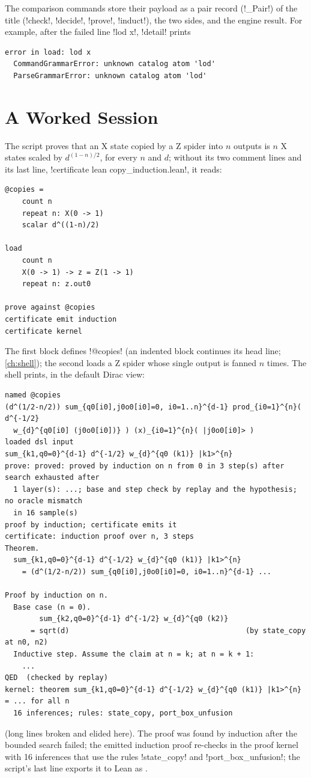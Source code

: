 The comparison commands store their payload as a pair record (\py!_Pair!) of the title (\code!check!, \code!decide!, \code!prove!, \code!induct!), the two sides, and the engine result. For example, after the failed line \code!lod x!, \azx!detail! prints
\begin{lstlisting}[style=grammar]
error in load: lod x
  CommandGrammarError: unknown catalog atom 'lod'
  ParseGrammarError: unknown catalog atom 'lod'
\end{lstlisting}

\section{A Worked Session}\label{sec:language-example}

The script  proves that an X state copied by a Z spider into $n$ outputs is $n$ X states scaled by $d^{(1-n)/2}$, for every $n$ and $d$; without its two comment lines and its last line, \azx!certificate lean copy_induction.lean!, it reads:
\begin{lstlisting}[style=azx]
@copies =
    count n
    repeat n: X(0 -> 1)
    scalar d^((1-n)/2)

load
    count n
    X(0 -> 1) -> z = Z(1 -> 1)
    repeat n: z.out0

prove against @copies
certificate emit induction
certificate kernel
\end{lstlisting}
The first block defines \code!@copies! (an indented block continues its head line; \cref{ch:shell}); the second loads a Z spider whose single output is fanned $n$ times. The shell prints, in the default Dirac view:
\begin{lstlisting}[style=grammar]
named @copies
(d^(1/2-n/2)) sum_{q0[i0],j0o0[i0]=0, i0=1..n}^{d-1} prod_{i0=1}^{n}( d^{-1/2}
  w_{d}^{q0[i0] (j0o0[i0])} ) (x)_{i0=1}^{n}( |j0o0[i0]> )
loaded dsl input
sum_{k1,q0=0}^{d-1} d^{-1/2} w_{d}^{q0 (k1)} |k1>^{n}
prove: proved: proved by induction on n from 0 in 3 step(s) after search exhausted after
  1 layer(s): ...; base and step check by replay and the hypothesis; no oracle mismatch
  in 16 sample(s)
proof by induction; certificate emits it
certificate: induction proof over n, 3 steps
Theorem.
  sum_{k1,q0=0}^{d-1} d^{-1/2} w_{d}^{q0 (k1)} |k1>^{n}
    = (d^(1/2-n/2)) sum_{q0[i0],j0o0[i0]=0, i0=1..n}^{d-1} ...

Proof by induction on n.
  Base case (n = 0).
        sum_{k2,q0=0}^{d-1} d^{-1/2} w_{d}^{q0 (k2)}
      = sqrt(d)                                         (by state_copy at n0, n2)
  Inductive step. Assume the claim at n = k; at n = k + 1:
    ...
QED  (checked by replay)
kernel: theorem sum_{k1,q0=0}^{d-1} d^{-1/2} w_{d}^{q0 (k1)} |k1>^{n} = ... for all n
  16 inferences; rules: state_copy, port_box_unfusion
\end{lstlisting}
(long lines broken and elided here). The proof was found by induction after the bounded search failed; the emitted induction proof re-checks in the proof kernel with 16 inferences that use the rules \code!state_copy! and \code!port_box_unfusion!; the script's last line exports it to Lean as .
